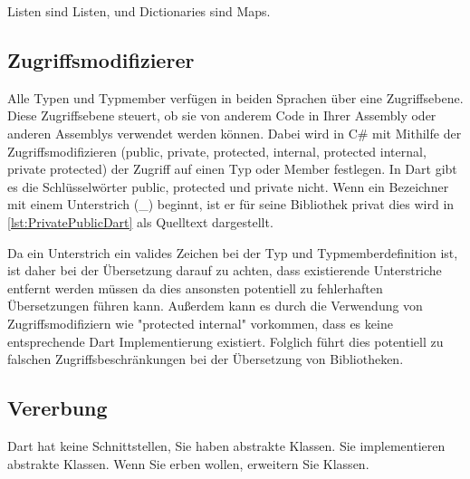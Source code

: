 Listen sind Listen, und Dictionaries sind Maps.


\begin{minipage}{\linewidth}

\end{minipage}



\subsection{Zugriffsmodifizierer}

Alle Typen und Typmember verfügen in beiden Sprachen über eine Zugriffsebene.  Diese Zugriffsebene steuert, ob sie von anderem Code in Ihrer Assembly oder anderen Assemblys verwendet werden können.  Dabei wird in C\# mit Mithilfe der Zugriffsmodifizieren (public,  private,  protected,  internal,  protected internal,  private protected) der Zugriff auf einen Typ oder Member festlegen.  In Dart gibt es die Schlüsselwörter public,  protected und private nicht. Wenn ein Bezeichner mit einem Unterstrich (\_) beginnt, ist er für seine Bibliothek privat dies wird in \ref{lst:PrivatePublicDart} als Quelltext dargestellt. 

\begin{minipage}{\linewidth}

\end{minipage}

Da ein Unterstrich ein valides Zeichen bei der Typ und Typmemberdefinition ist, ist daher bei der Übersetzung darauf zu achten,  dass existierende Unterstriche entfernt werden müssen da dies ansonsten potentiell zu fehlerhaften Übersetzungen führen kann.  Außerdem kann es durch die Verwendung von Zugriffsmodifiziern wie "protected internal" vorkommen, dass es keine entsprechende Dart Implementierung existiert.  Folglich führt dies potentiell zu falschen Zugriffsbeschränkungen bei der Übersetzung von Bibliotheken. 

\subsection{Vererbung}

Dart hat keine Schnittstellen, Sie haben abstrakte Klassen. Sie implementieren abstrakte Klassen. Wenn Sie erben wollen, erweitern Sie Klassen.

